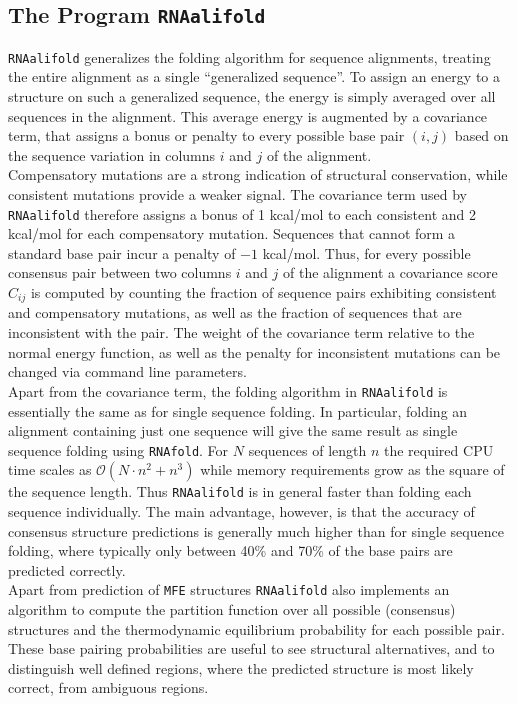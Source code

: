\documentclass[a4paper]{article}
\begin{document}
\subsection{The Program \texttt{RNAalifold}}
\texttt{RNAalifold} generalizes the folding algorithm for sequence
alignments, treating the entire alignment as a single ``generalized
sequence''.  To assign an energy to a structure on such a generalized
sequence, the energy is simply averaged over all sequences in the
alignment. This average energy is augmented by a covariance term, that
assigns a bonus or penalty to every possible base pair $(i,j)$ based
on the sequence variation in columns $i$ and $j$ of the alignment.\\

Compensatory mutations are a strong indication of structural
conservation, while consistent mutations provide a weaker signal. The
covariance term used by \texttt{RNAalifold} therefore assigns a bonus
of 1 kcal/mol to each consistent and 2 kcal/mol for each compensatory
mutation. Sequences that cannot form a standard base pair incur a
penalty of $-1$ kcal/mol. Thus, for every possible consensus pair
between two columns $i$ and $j$ of the alignment a covariance score
$C_{ij}$ is computed by counting the fraction of sequence pairs
exhibiting consistent and compensatory mutations, as well as the
fraction of sequences that are inconsistent with the pair. The weight
of the covariance term relative to the normal energy function, as well
as the penalty for inconsistent mutations can be changed via command
line parameters.\\

Apart from the covariance term, the folding algorithm in
\texttt{RNAalifold} is essentially the same as for single sequence
folding. In particular, folding an alignment containing just one
sequence will give the same result as single sequence folding using
\texttt{RNAfold}. For $N$ sequences of length $n$ the required CPU
time scales as $\mathcal{O}(N\cdot n^2 + n^3)$ while memory
requirements grow as the square of the sequence length. Thus
\texttt{RNAalifold} is in general faster than folding each sequence
individually. The main advantage, however, is that the accuracy of
consensus structure predictions is generally much higher than for
single sequence folding, where typically only between 40\% and 70\% of
the base pairs are predicted correctly.\\

Apart from prediction of \texttt{MFE} structures \texttt{RNAalifold}
also implements an algorithm to compute the partition function over
all possible (consensus) structures and the thermodynamic equilibrium
probability for each possible pair. These base pairing probabilities
are useful to see structural alternatives, and to distinguish well
defined regions, where the predicted structure is most likely correct,
from ambiguous regions.\\
\end{document}
